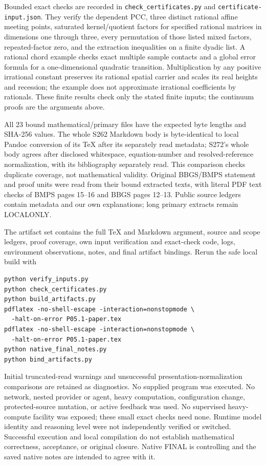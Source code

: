 \documentclass[11pt]{article}
\begin{document}
Bounded exact checks are recorded in \texttt{check\_certificates.py} and \texttt{certificate-input.json}. They verify the dependent PCC, three distinct rational affine meeting points, saturated kernel/quotient factors for specified rational matrices in dimensions one through three, every permutation of those listed mixed factors, repeated-factor zero, and the extraction inequalities on a finite dyadic list. A rational chord example checks exact multiple sample contacts and a global error formula for a one-dimensional quadratic transition. Multiplication by any positive irrational constant preserves its rational spatial carrier and scales its real heights and recession; the example does not approximate irrational coefficients by rationals. These finite results check only the stated finite inputs; the continuum proofs are the arguments above.

All 23 bound mathematical/primary files have the expected byte lengths and SHA-256 values. The whole S262 Markdown body is byte-identical to local Pandoc conversion of its TeX after its separately read metadata; S272's whole body agrees after disclosed whitespace, equation-number and resolved-reference normalization, with its bibliography separately read. This comparison checks duplicate coverage, not mathematical validity. Original BBGS/BMPS statement and proof units were read from their bound extracted texts, with literal PDF text checks of BMPS pages 15--16 and BBGS pages 12--13. Public source ledgers contain metadata and our own explanations; long primary extracts remain LOCALONLY.

The artifact set contains the full TeX and Markdown argument, source and scope ledgers, proof coverage, own input verification and exact-check code, logs, environment observations, notes, and final artifact bindings. Rerun the safe local build with
\begin{verbatim}
python verify_inputs.py
python check_certificates.py
python build_artifacts.py
pdflatex -no-shell-escape -interaction=nonstopmode \
  -halt-on-error P05.1-paper.tex
pdflatex -no-shell-escape -interaction=nonstopmode \
  -halt-on-error P05.1-paper.tex
python native_final_notes.py
python bind_artifacts.py
\end{verbatim}
Initial truncated-read warnings and unsuccessful presentation-normalization comparisons are retained as diagnostics. No supplied program was executed. No network, nested provider or agent, heavy computation, configuration change, protected-source mutation, or active feedback was used. No supervised heavy-compute facility was exposed; these small exact checks need none. Runtime model identity and reasoning level were not independently verified or switched. Successful execution and local compilation do not establish mathematical correctness, acceptance, or original closure. Native FINAL is controlling and the saved native notes are intended to agree with it.
\end{document}
